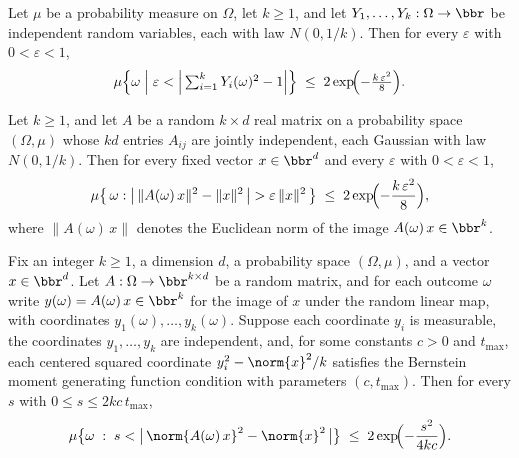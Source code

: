 \begin{lemma}
\label{chi_squared_tail}
\leanok
{}
Let $\mu$ be a probability measure on $\Omega$, let $k \ge 1$, and let $Y_1,\dots,Y_k :
\Omega \to \bbr$ be independent random variables, each with law $N(0, 1/k)$. Then for
every $\varepsilon$ with $0 < \varepsilon < 1$,
\[
  \mu\!\left\{\omega \;\middle|\; \varepsilon
    < \Bigl|\,\textstyle\sum_{i=1}^{k} Y_i(\omega)^2 - 1\Bigr|\right\}
  \;\le\; 2\exp\!\Bigl(-\tfrac{k\,\varepsilon^2}{8}\Bigr).
\]
\end{lemma}

\begin{theorem}
\label{jl_concentration_single_via_chi_squared}
\leanok
{}
Let $k \ge 1$, and let $A$ be a random $k \times d$ real matrix on a probability space
$(\Omega, \mu)$ whose $kd$ entries $A_{ij}$ are jointly independent, each Gaussian with
law $N(0, 1/k)$. Then for every fixed vector $x \in \bbr^d$ and every $\varepsilon$ with
$0 < \varepsilon < 1$,
\[
\mu\bigl\{\,\omega : \bigl|\,\|A(\omega)\,x\|^2 - \|x\|^2\,\bigr| > \varepsilon\,\|x\|^2
\,\bigr\}
  \;\le\; 2\exp\!\Bigl(-\frac{k\,\varepsilon^2}{8}\Bigr),
\]
where $\|A(\omega)\,x\|$ denotes the Euclidean norm of the image $A(\omega)\,x \in
\bbr^k$.
\end{theorem}

\begin{theorem}
\label{jl_concentration_single_via_bernstein}
\leanok
{}
Fix an integer $k \ge 1$, a dimension $d$, a probability space $(\Omega, \mu)$, and a
vector $x \in \bbr^d$. Let $A : \Omega \to \bbr^{k \times d}$ be a random matrix, and
for each outcome $\omega$ write $y(\omega) = A(\omega)\,x \in \bbr^k$ for the image of
$x$ under the random linear map, with coordinates $y_1(\omega), \dots, y_k(\omega)$.
Suppose each coordinate $y_i$ is measurable, the coordinates $y_1, \dots, y_k$ are
independent, and, for some constants $c > 0$ and $t_{\max}$, each centered squared
coordinate $y_i^2 - \norm{x}^2/k$ satisfies the Bernstein moment generating function
condition with parameters $(c, t_{\max})$. Then for every $s$ with $0 \le s \le
2kc\,t_{\max}$,
\[
  \mu\bigl\{\omega \;:\; s < \bigl|\,\norm{A(\omega)\,x}^2 - \norm{x}^2\,\bigr|\bigr\}
  \;\le\; 2\exp\!\Bigl(-\frac{s^2}{4kc}\Bigr).
\]
\end{theorem}
